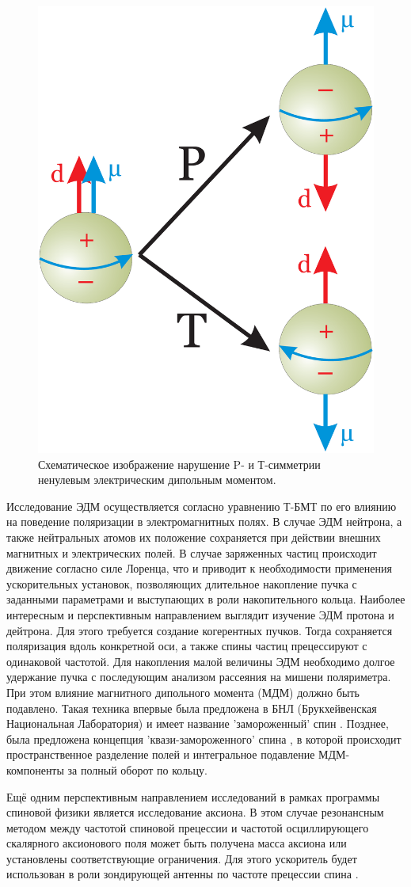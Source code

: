\begin{figure}
	\centering
	\includegraphics[width=0.4\linewidth]{images/4_EDM_P_T}
	\caption{Схематическое изображение нарушение P- и Т-симметрии ненулевым электрическим дипольным моментом.}
	\label{fig:4edmpt}
\end{figure}

\par	Исследование ЭДМ осуществляется согласно уравнению Т-БМТ по его влиянию на поведение поляризации в электромагнитных полях. В случае ЭДМ нейтрона, а также нейтральных атомов их положение сохраняется при действии внешних магнитных и электрических полей. В случае заряженных частиц происходит движение согласно силе Лоренца, что и приводит к необходимости применения ускорительных установок, позволяющих длительное накопление пучка с заданными параметрами и выступающих в роли накопительного кольца. Наиболее интересным и перспективным направлением выглядит изучение ЭДМ протона и дейтрона. Для этого требуется создание когерентных пучков. Тогда сохраняется поляризация вдоль конкретной оси, а также спины частиц прецессируют с одинаковой частотой. Для накопления малой величины ЭДМ необходимо долгое удержание пучка с последующим анализом рассеяния на мишени поляриметра. При этом влияние магнитного дипольного момента (МДМ) должно быть подавлено. Такая техника впервые была предложена в БНЛ (Брукхейвенская Национальная Лаборатория) и имеет название 'замороженный' спин \cite{Farley:edm}. Позднее, была предложена концепция 'квази-замороженного' спина \cite{QFS}, в которой происходит пространственное разделение полей и интегральное подавление МДМ-компоненты за полный оборот по кольцу.

\par	Ещё одним перспективным направлением исследований в рамках программы спиновой физики является исследование аксиона. В этом случае резонансным методом между частотой спиновой прецессии и частотой осциллирующего скалярного аксионового поля может быть получена масса аксиона или установлены соответствующие ограничения. Для этого ускоритель будет использован в роли зондирующей антенны по частоте прецессии спина \cite{Axion_Nikolaev}.


